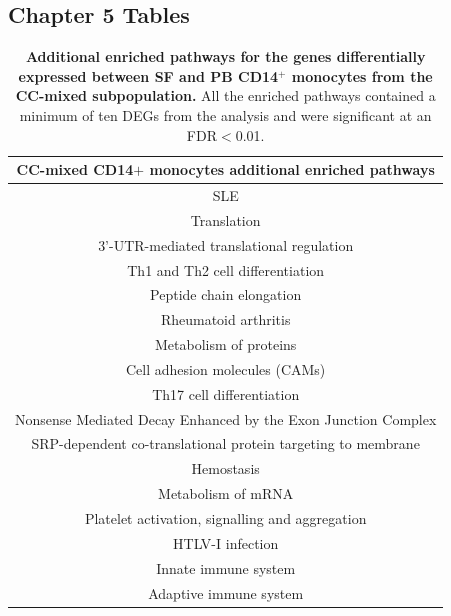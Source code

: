 \subsection{Chapter 5 Tables}

\begin{table}[htbp]
\centering
\begin{tabular}{@{} c }
\toprule
\textbf{CC-mixed CD14$+$ monocytes additional enriched pathways} \\
\midrule
\midrule
SLE \\
Translation \\
3'-UTR-mediated translational regulation \\
Th1 and Th2 cell differentiation \\
Peptide chain elongation \\
Rheumatoid arthritis \\
Metabolism of proteins \\
Cell adhesion molecules (CAMs) \\
Th17 cell differentiation \\
Nonsense Mediated Decay Enhanced by the Exon Junction Complex \\
SRP-dependent co-translational protein targeting to membrane \\
Hemostasis \\
Metabolism of mRNA \\
Platelet activation, signalling and aggregation \\
HTLV-I infection \\
Innate immune system \\
Adaptive immune system \\
\bottomrule
\end{tabular}
\medskip %
\caption[Additional enriched pathways for the genes differentially expressed between SF and PB CD14$^+$ monocytes from the CC-mixed subpopulation.]{\textbf{Additional enriched pathways for the genes differentially expressed between SF and PB CD14$^+$ monocytes from the CC-mixed subpopulation.} All the enriched pathways contained a minimum of ten DEGs from the analysis and were significant at an FDR$<$0.01.}
\label{tab:PSA_scRNAseq_CC_mixed_additional_pathways}
\end{table}


